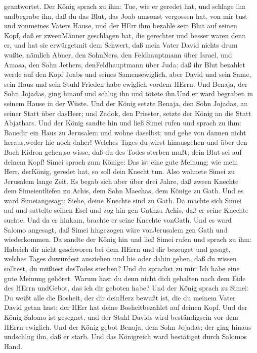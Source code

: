 geantwortet.  Der König sprach zu ihm: Tue, wie er geredet
hat, und schlage ihn undbegrabe ihn, daß du das Blut, das Joab umsonst
vergossen hat, von mir tust und vonmeines Vaters Hause, 
und der HErr ihm bezahle sein Blut auf seinen Kopf, daß er zweenMänner
geschlagen hat, die gerechter und besser waren denn er, und hat sie
erwürgetmit dem Schwert, daß mein Vater David nichts drum wußte, nämlich
Abner, den SohnNers, den Feldhauptmann über Israel, und Amasa, den Sohn
Jethers, denFeldhauptmann über Juda;  daß ihr Blut bezahlet
werde auf den Kopf Joabs und seines Samensewiglich, aber David und sein
Same, sein Haus und sein Stuhl Frieden habe ewiglich vordem HErrn.
 Und Benaja, der Sohn Jojadas, ging hinauf und schlug ihn
und tötete ihn.Und er ward begraben in seinem Hause in der Wüste.
 Und der König setzte Benaja, den Sohn Jojadas, an seiner
Statt über dasHeer; und Zadok, den Priester, setzte der König an die
Statt Abjathars.  Und der König sandte hin und ließ Simei
rufen und sprach zu ihm: Bauedir ein Haus zu Jerusalem und wohne
daselbst; und gehe von dannen nicht heraus,weder hie noch daher!
 Welches Tages du wirst hinausgehen und über den Bach
Kidron gehen,so wisse, daß du des Todes sterben mußt; dein Blut sei auf
deinem Kopf!  Simei sprach zum Könige: Das ist eine gute
Meinung; wie mein Herr, derKönig, geredet hat, so soll dein Knecht tun.
Also wohnete Simei zu Jerusalem lange Zeit.  Es begab sich
aber über drei Jahre, daß zween Knechte dem Simeientliefen zu Achis, dem
Sohn Maechas, dem Könige zu Gath. Und es ward Simeiangesagt: Siehe,
deine Knechte sind zu Gath.  Da machte sich Simei auf und
sattelte seinen Esel und zog hin gen Gathzu Achis, daß er seine Knechte
suchte. Und da er hinkam, brachte er seine Knechte vonGath.
 Und es ward Salomo angesagt, daß Simei hingezogen wäre
vonJerusalem gen Gath und wiederkommen.  Da sandte der
König hin und ließ Simei rufen und sprach zu ihm: Habeich dir nicht
geschworen bei dem HErrn und dir bezeuget und gesagt, welches Tages
duwürdest ausziehen und hie oder dahin gehen, daß du wissen solltest, du
müßtest desTodes sterben? Und du sprachst zu mir: Ich habe eine gute
Meinung gehöret.  Warum hast du denn nicht dich gehalten
nach dem Eide des HErrn undGebot, das ich dir geboten habe?
 Und der König sprach zu Simei: Du weißt alle die Bosheit,
der dir deinHerz bewußt ist, die du meinem Vater David getan hast; der
HErr hat deine Bosheitbezahlet auf deinen Kopf.  Und der
König Salomo ist gesegnet, und der Stuhl Davids wird beständigsein vor
dem HErrn ewiglich.  Und der König gebot Benaja, dem Sohn
Jojadas; der ging hinaus undschlug ihn, daß er starb. Und das Königreich
ward bestätiget durch Salomos Hand.

